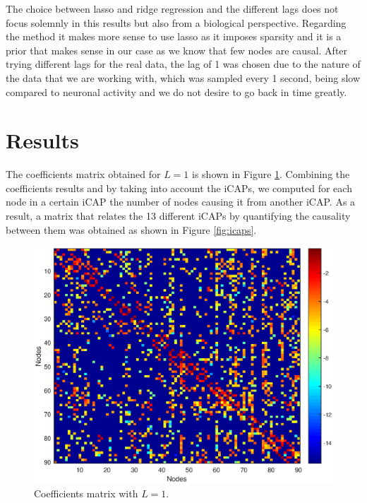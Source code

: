 \documentclass[10pt,conference,compsocconf]{IEEEtran}
\begin{document}
The choice between lasso and ridge regression and the different lags does not focus solemnly in this results but also from a biological perspective. Regarding the method it makes more sense to use lasso as it imposes sparsity and it is a prior that makes sense in our case as we know that few nodes are causal. After trying different lags for the real data, the lag of 1 was chosen due to the nature of the data that we are working with, which was sampled every 1 second, being slow compared to neuronal activity and we do not desire to go back in time greatly.


\section{Results}
\label{sec:results}

The coefficients matrix obtained for $L=1$ is shown in Figure \ref{fig:coef}. Combining the coefficients results and by taking into account the iCAPs, we computed for each node in a certain iCAP the number of nodes causing it from another iCAP. As a result, a matrix that relates the 13 different iCAPs by quantifying the causality between them  was obtained as shown in Figure \ref{fig:icaps}.


\begin{figure}%
    \centering
    \includegraphics[scale=0.5]{images/coeff.eps}
    \vspace{-5mm}
    \caption{Coefficients matrix with $L=1$.}%
    \vspace{-7mm}
    \label{fig:coef}%
\end{figure}
\end{document}
